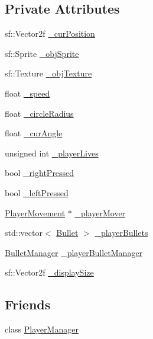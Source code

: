 \subsection*{Private Attributes}
\begin{DoxyCompactItemize}
\item 
sf\+::\+Vector2f \hyperlink{class_player_a3eee43afb7a372baca390749259949f8}{\+\_\+cur\+Position}
\item 
sf\+::\+Sprite \hyperlink{class_player_a6b0a2f6db37865415e5855868d469a15}{\+\_\+obj\+Sprite}
\item 
sf\+::\+Texture \hyperlink{class_player_a82b80133ff2c62d50718dca10b004be7}{\+\_\+obj\+Texture}
\item 
float \hyperlink{class_player_a2058005a9cb8d0ee1930178ab5965ac1}{\+\_\+speed}
\item 
float \hyperlink{class_player_abfba97cad280b5f31cb10d5e3df35be3}{\+\_\+circle\+Radius}
\item 
float \hyperlink{class_player_abc54196e9192b4e91542f8edbafecf4b}{\+\_\+cur\+Angle}
\item 
unsigned int \hyperlink{class_player_a3ac2d7fa51966139efd25bc1b8552208}{\+\_\+player\+Lives}
\item 
bool \hyperlink{class_player_a8aff890e78e0f13a19d412e1a1aa0c19}{\+\_\+right\+Pressed}
\item 
bool \hyperlink{class_player_a968f709b83915a6805d2f194b753e5a4}{\+\_\+left\+Pressed}
\item 
\hyperlink{class_player_movement}{Player\+Movement} $\ast$ \hyperlink{class_player_ae56c992348833fc0cf154e55b2b348f8}{\+\_\+player\+Mover}
\item 
std\+::vector$<$ \hyperlink{class_bullet}{Bullet} $>$ \hyperlink{class_player_ab261cdf1236f7e794f9b405409315419}{\+\_\+player\+Bullets}
\item 
\hyperlink{class_bullet_manager}{Bullet\+Manager} \hyperlink{class_player_a89d5ba57b7de854e218b0917bfa5029d}{\+\_\+player\+Bullet\+Manager}
\item 
sf\+::\+Vector2f \hyperlink{class_player_a2782ada46f92cfdd3d68bcacd5253333}{\+\_\+display\+Size}
\end{DoxyCompactItemize}
\subsection*{Friends}
\begin{DoxyCompactItemize}
\item 
class \hyperlink{class_player_af4dd6083207676104071a0b097ff2bff}{Player\+Manager}
\end{DoxyCompactItemize}


